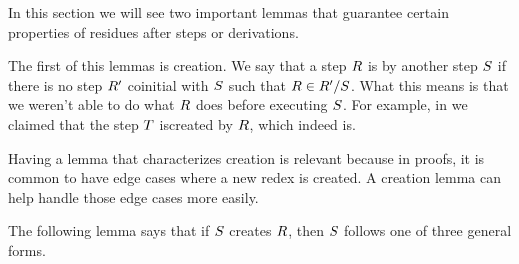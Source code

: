 

In this section we will see two important lemmas that guarantee certain properties
of residues after steps or derivations.

\bigskip

The first of this lemmas is creation.
We say that a step $R$ is  by another step $S$ if
there is no step $R'$ coinitial with $S$ such that $R \in R' / S$.
What this means is that we weren't able to do what $R$ does before executing $S$.
For example, in  we claimed
that the step $T$ iscreated by $R$, which indeed is.

Having a lemma that characterizes creation is relevant because in proofs,
it is common to have edge cases where a new redex is created.
A creation lemma can help handle those edge cases more easily.

The following lemma says that if $S$ creates $R$, then $S$ follows
one of three general forms.


